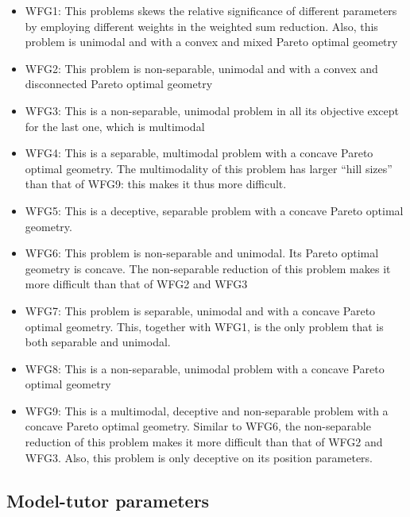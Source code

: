        \begin{itemize}
            \item WFG1: This problems skews the relative significance of different parameters by employing different weights in the weighted sum reduction. Also, this problem is unimodal and with a convex and mixed Pareto optimal geometry
            \item WFG2: This problem is non-separable, unimodal and with a convex and disconnected Pareto optimal geometry
            \item WFG3: This is a non-separable, unimodal problem in all its objective except for the last one, which is multimodal
            \item WFG4: This is a separable, multimodal problem with a concave Pareto optimal geometry. The multimodality of this problem has larger “hill sizes” than that of WFG9: this makes it thus more difficult.
            \item WFG5: This is a deceptive, separable problem with a concave Pareto optimal geometry.
            \item WFG6: This problem is non-separable and unimodal. Its Pareto optimal geometry is concave. The non-separable reduction of this problem makes it more difficult than that of WFG2 and WFG3
            \item WFG7: This problem is separable, unimodal and with a concave Pareto optimal geometry. This, together with WFG1, is the only problem that is both separable and unimodal.
            \item WFG8: This is a non-separable, unimodal problem with a concave Pareto optimal geometry
            \item WFG9: This is a multimodal, deceptive and non-separable problem with a concave Pareto optimal geometry. Similar to WFG6, the non-separable reduction of this problem makes it more difficult than that of WFG2 and WFG3. Also, this problem is only deceptive on its position parameters.
        \end{itemize}

\subsection{Model-tutor parameters}

